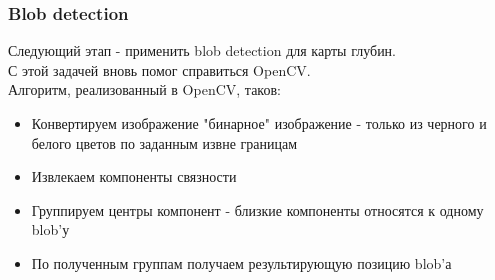 \documentclass{beamer}
\begin{document}
		\begin{frame}
			\frametitle{Blob detection}
			
			Следующий этап - применить blob detection для карты глубин.\\
			С этой задачей вновь помог справиться OpenCV.\\
			Алгоритм, реализованный в OpenCV, таков:\\
			\begin{itemize}
				\item Конвертируем изображение "бинарное" изображение - только
					  из черного и белого цветов по заданным извне границам
				\item Извлекаем компоненты связности
				\item Группируем центры компонент - близкие компоненты относятся к одному blob'у
				\item По полученным группам получаем результирующую позицию blob'а
			\end{itemize}
			
		\end{frame}
\end{document}
